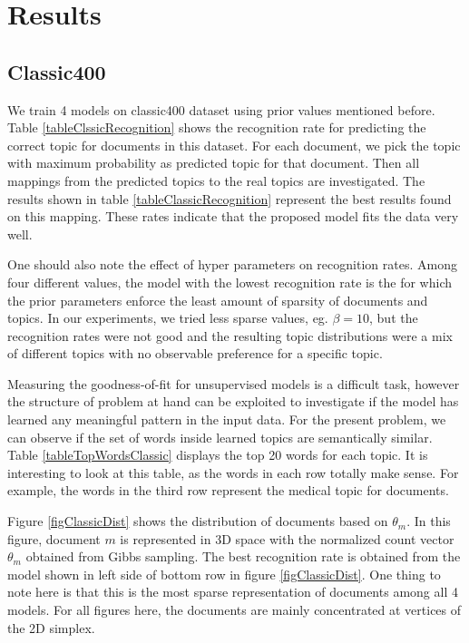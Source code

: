 \documentclass[twoside,12pt]{article}
\begin{document}
\section{Results}


\subsection{Classic400}
We train 4 models on classic400 dataset using prior values mentioned before. Table \ref{tableClssicRecognition} shows the recognition rate for predicting the correct topic for documents in this dataset. For each document, we pick the topic with maximum probability as predicted topic for that document. Then all mappings from the predicted topics to the real topics are investigated. The results shown in table \ref{tableClassicRecognition} represent the best results found on this mapping. These rates indicate that the proposed model fits the data very well.

One should also note the effect of hyper parameters on recognition rates. Among four different values, the model with the lowest recognition rate is the for which the prior parameters enforce the least amount of sparsity of documents and topics. In our experiments, we tried less sparse values, eg. $\beta=10$, but the recognition rates were not good and the resulting topic distributions were a mix of different topics with no observable preference for a specific topic.

Measuring the goodness-of-fit for unsupervised models is a difficult task, however the structure of problem at hand can be exploited to investigate if the model has learned any meaningful pattern in the input data. For the present problem, we can observe if the set of words inside learned topics are semantically similar. Table \ref{tableTopWordsClassic} displays the top 20 words for each topic. It is interesting to look at this table, as the words in each row totally make sense. For example, the words in the third row represent the medical topic for documents.

Figure \ref{figClassicDist} shows the distribution of documents based on $\theta_m$. In this figure, document $m$ is represented in 3D space with the normalized count vector $\theta_m$ obtained from Gibbs sampling. The best recognition rate is obtained from the model shown in left side of bottom row in figure \ref{figClassicDist}. One thing to note here is that this is the most sparse representation of documents among all 4 models. For all figures here, the documents are mainly concentrated at vertices of the 2D simplex. 
\end{document}
